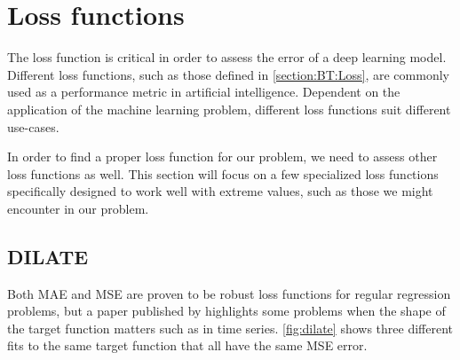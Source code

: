 
\section{Loss functions}
\label{section:RelatedWork:Loss}

The loss function is critical in order to assess the error of a deep learning model.
Different loss functions, such as those defined in \ref{section:BT:Loss},
are commonly used as a performance metric in artificial intelligence.
Dependent on the application of the machine learning problem, different loss functions suit different use-cases.

In order to find a proper loss function for our problem, we need to assess other loss functions as well.
This section will focus on a few specialized loss functions specifically designed to work well with extreme values, such as those we might encounter in our problem.

\subsection{DILATE}

Both MAE and MSE are proven to be robust loss functions for regular regression problems,
but a paper published by \citeauthor{Guen2019} highlights some problems when the shape of the target function matters
such as in time series.
\autoref{fig:dilate} shows three different fits to the same target function that all have
the same MSE error.

